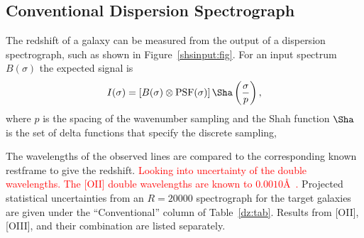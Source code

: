 \documentclass[preprint]{aastex}
\begin{document}
\subsection{Conventional Dispersion Spectrograph} 
The redshift of a galaxy can be measured from the output of a dispersion spectrograph, such as shown in Figure~\ref{shsinput:fig}.
For an input spectrum $B(\sigma)$ the expected signal is
\begin{equation}
I(\sigma) = \left[B(\sigma)\otimes \mbox{PSF}(\sigma)\right]\Sha\left(\frac{\sigma}{p}\right),
\label{conventional:eqn}
\end{equation}
where $p$ is the spacing of the wavenumber sampling and the Shah function $\Sha$ is the set of delta functions
that specify the discrete sampling,

The wavelengths of the observed lines are compared to the corresponding known restframe to give
the redshift.
\textcolor{red}{Looking into uncertainty of the double wavelengths.
The [OII] double wavelengths are known to $0.0010$\AA\ \citep{1993JPCRD..22.1179M}.}
Projected statistical uncertainties from an $R=20000$ spectrograph for the target galaxies are given under
the ``Conventional'' column of Table~\ref{dz:tab}.  Results from [OII], [OIII], and their combination are listed separately.
\end{document}
